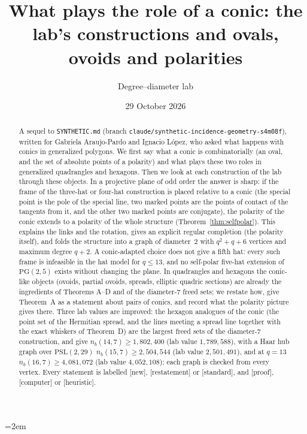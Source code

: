 \documentclass[11pt]{amsart}
\title[What plays the role of a conic]{What plays the role of a conic: the lab's constructions and ovals, ovoids and polarities}
\author{Degree--diameter lab}
\date{29 October 2026}
\theoremstyle{definition}
\theoremstyle{remark}
\newcommand{\PG}{\mathrm{PG}}
\newcommand{\status}[1]{\textup{[#1]}}
\begin{document}
\sloppy\emergencystretch=2em

\begin{abstract}
A sequel to \texttt{SYNTHETIC.md} (branch \texttt{claude/synthetic-incidence-geometry-s4m08f}), written for
Gabriela Araujo-Pardo and Ignacio L\'opez, who asked what happens with conics in generalized polygons. We first say
what a conic is combinatorially (an oval, and the set of absolute points of a polarity) and what plays these two
roles in generalized quadrangles and hexagons. Then we look at each construction of the lab through these objects.
In a projective plane of odd order the answer is sharp: if the frame of the three-hat or four-hat construction is
placed relative to a conic (the special point is the pole of the special line, two marked points are the points of
contact of the tangents from it, and the other two marked points are conjugate), the polarity of the conic extends
to a polarity of the whole structure (Theorem~\ref{thm:selfpolar}). This explains the links and the rotation, gives
an explicit regular completion (the polarity itself), and folds the structure into a graph of diameter~$2$ with
$q^2+q+6$ vertices and maximum degree $q+2$. A conic-adapted choice does not give a fifth hat: every such frame is
infeasible in the hat model for $q\le13$, and no self-polar five-hat extension of $\PG(2,5)$ exists without changing the plane. In quadrangles and
hexagons the conic-like objects (ovoids, partial ovoids, spreads, elliptic quadric sections) are already the
ingredients of Theorems A--D and of the diameter-$7$ freed sets; we restate how, give Theorem~A as a statement
about pairs of conics, and record what the polarity picture gives there. Three lab values are improved: the hexagon
analogues of the conic (the point set of the Hermitian spread, and the lines meeting a spread line together with the
exact whiskers of Theorem~D) are the largest freed sets of the diameter-$7$ construction, and give
$n_b(14,7)\ge1{,}802{,}400$ (lab value $1{,}789{,}588$), with a Haar hub graph over $\mathrm{PSL}(2,29)$
$n_b(15,7)\ge2{,}504{,}544$ (lab value $2{,}501{,}491$), and at $q=13$ $n_b(16,7)\ge4{,}081{,}072$ (lab value
$4{,}052{,}108$); each graph is checked from every vertex.
Every statement is labelled \status{new}, \status{restatement} or \status{standard}, and \status{proof}, \status{computer} or
\status{heuristic}.
\end{abstract}

\maketitle
\end{document}
